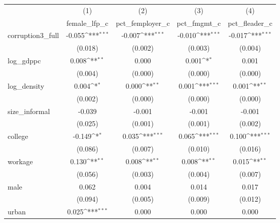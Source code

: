 {
\def\sym#1{\ifmmode^{#1}\else\(^{#1}\)\fi}
\begin{tabular}{l*{4}{c}}
\hline\hline
            &\multicolumn{1}{c}{(1)}&\multicolumn{1}{c}{(2)}&\multicolumn{1}{c}{(3)}&\multicolumn{1}{c}{(4)}\\
            &\multicolumn{1}{c}{female\_lfp\_c}&\multicolumn{1}{c}{pct\_femployer\_c}&\multicolumn{1}{c}{pct\_fmgmt\_c}&\multicolumn{1}{c}{pct\_fleader\_c}\\
\hline
corruption3\_full&      -0.055\sym{***}&      -0.007\sym{***}&      -0.010\sym{***}&      -0.017\sym{***}\\
            &     (0.018)         &     (0.002)         &     (0.003)         &     (0.004)         \\
[1em]
log\_gdppc   &       0.008\sym{**} &       0.000         &       0.001\sym{*}  &       0.001         \\
            &     (0.004)         &     (0.000)         &     (0.000)         &     (0.000)         \\
[1em]
log\_density &       0.004\sym{*}  &       0.000\sym{**} &       0.001\sym{***}&       0.001\sym{**} \\
            &     (0.002)         &     (0.000)         &     (0.000)         &     (0.000)         \\
[1em]
size\_informal&      -0.039         &      -0.001         &      -0.001         &      -0.001         \\
            &     (0.025)         &     (0.001)         &     (0.001)         &     (0.002)         \\
[1em]
college     &      -0.149\sym{*}  &       0.035\sym{***}&       0.065\sym{***}&       0.100\sym{***}\\
            &     (0.086)         &     (0.007)         &     (0.010)         &     (0.016)         \\
[1em]
workage     &       0.130\sym{**} &       0.008\sym{**} &       0.008\sym{**} &       0.015\sym{**} \\
            &     (0.056)         &     (0.003)         &     (0.004)         &     (0.007)         \\
[1em]
male        &       0.062         &       0.004         &       0.014         &       0.017         \\
            &     (0.094)         &     (0.005)         &     (0.009)         &     (0.012)         \\
[1em]
urban       &       0.025\sym{***}&       0.000         &       0.000         &       0.000         \\

\end{tabular}}
